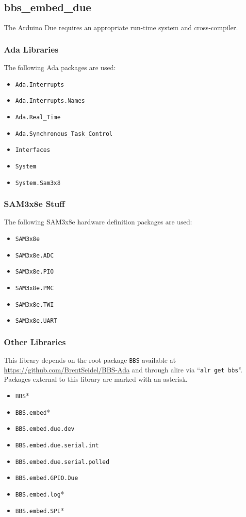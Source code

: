 \documentclass[10pt, openany]{book}
\newcommand{\package}[1]{\texttt{#1}}
\newcommand{\keyword}[1]{\texttt{#1}}
\begin{document}
\subsection{bbs\_embed\_due}
The Arduino Due requires an appropriate run-time system and cross-compiler.
\subsubsection{Ada Libraries}
The following Ada packages are used:
\begin{itemize}
  \item \package{Ada.Interrupts}
  \item \package{Ada.Interrupts.Names}
  \item \package{Ada.Real\_Time}
  \item \package{Ada.Synchronous\_Task\_Control}
  \item \package{Interfaces}
  \item \package{System}
  \item \package{System.Sam3x8}
\end{itemize}
\subsubsection{SAM3x8e Stuff}
The following SAM3x8e hardware definition packages are used:
\begin{itemize}
  \item \package{SAM3x8e}
  \item \package{SAM3x8e.ADC}
  \item \package{SAM3x8e.PIO}
  \item \package{SAM3x8e.PMC}
  \item \package{SAM3x8e.TWI}
  \item \package{SAM3x8e.UART}
\end{itemize}
\subsubsection{Other Libraries}
This library depends on the root package \package{BBS} available at \url{https://github.com/BrentSeidel/BBS-Ada} and through alire via ``\keyword{alr get bbs}''.  Packages external to this library are marked with an asterisk.
\begin{itemize}
  \item \package{BBS}*
  \item \package{BBS.embed}*
  \item \package{BBS.embed.due.dev}
  \item \package{BBS.embed.due.serial.int}
  \item \package{BBS.embed.due.serial.polled}
  \item \package{BBS.embed.GPIO.Due}
  \item \package{BBS.embed.log}*
  \item \package{BBS.embed.SPI}*
\end{itemize}
\end{document}
